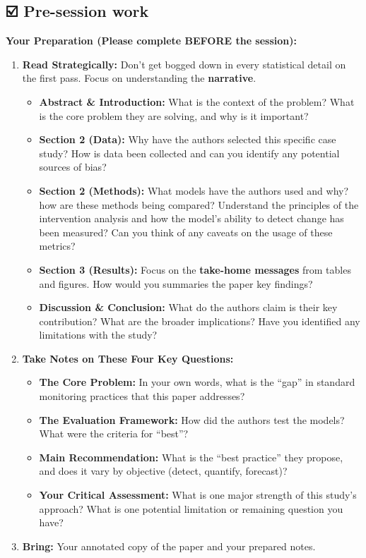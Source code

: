 \documentclass[
  letterpaper,
  DIV=11,
  numbers=noendperiod]{scrartcl}
\begin{document}
\subsection{☑️ Pre-session work}\label{pre-session-work}

\textbf{Your Preparation (Please complete BEFORE the session):}

\begin{enumerate}
\def\labelenumi{\arabic{enumi}.}
\item
  \textbf{Read Strategically:} Don't get bogged down in every
  statistical detail on the first pass. Focus on understanding the
  \textbf{narrative}.

  \begin{itemize}
  \item
    \textbf{Abstract \& Introduction:} What is the context of the
    problem? What is the core problem they are solving, and why is it
    important?
  \item
    \textbf{Section 2 (Data):} Why have the authors selected this
    specific case study? How is data been collected and can you identify
    any potential sources of bias?
  \item
    \textbf{Section 2 (Methods):} What models have the authors used and
    why? how are these methods being compared? Understand the principles
    of the intervention analysis and how the model's ability to detect
    change has been measured? Can you think of any caveats on the usage
    of these metrics?
  \item
    \textbf{Section 3 (Results):} Focus on the \textbf{take-home
    messages} from tables and figures. How would you summaries the paper
    key findings?
  \item
    \textbf{Discussion \& Conclusion:} What do the authors claim is
    their key contribution? What are the broader implications? Have you
    identified any limitations with the study?
  \end{itemize}
\item
  \textbf{Take Notes on These Four Key Questions:}

  \begin{itemize}
  \item
    \textbf{The Core Problem:} In your own words, what is the ``gap'' in
    standard monitoring practices that this paper addresses?
  \item
    \textbf{The Evaluation Framework:} How did the authors test the
    models? What were the criteria for ``best''?
  \item
    \textbf{Main Recommendation:} What is the ``best practice'' they
    propose, and does it vary by objective (detect, quantify, forecast)?
  \item
    \textbf{Your Critical Assessment:} What is one major strength of
    this study's approach? What is one potential limitation or remaining
    question you have?
  \end{itemize}
\item
  \textbf{Bring:} Your annotated copy of the paper and your prepared
  notes.
\end{enumerate}
\end{document}
